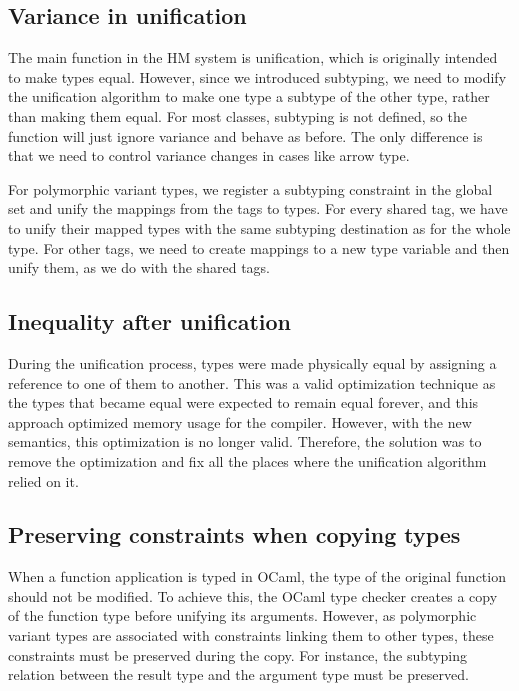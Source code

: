 \documentclass[a4paper,11pt,oneside]{article}
\theoremstyle{definition}
\begin{document}
\subsection{Variance in unification}

The main function in the HM system is unification, which is originally
intended to make types equal. However, since we introduced subtyping, we
need to modify the unification algorithm to make one type a subtype of the
other type, rather than making them equal. For most classes, subtyping is
not defined, so the function will just ignore variance and behave as before.
The only difference is that we need to control variance changes in cases
like arrow type.

For polymorphic variant types, we register a subtyping constraint in the
global set and unify the mappings from the tags to types. For every shared
tag, we have to unify their mapped types with the same subtyping destination
as for the whole type. For other tags, we need to create mappings to a new
type variable and then unify them, as we do with the shared tags.

\subsection{Inequality after unification}

During the unification process, types were made physically equal by
assigning a reference to one of them to another. This was a valid
optimization technique as the types that became equal were expected to
remain equal forever, and this approach optimized memory usage for the
compiler. However, with the new semantics, this optimization is no longer
valid. Therefore, the solution was to remove the optimization and fix all
the places where the unification algorithm relied on it.

\subsection{Preserving constraints when copying types}

When a function application is typed in OCaml, the type of the original
function should not be modified. To achieve this, the OCaml type checker
creates a copy of the function type before unifying its arguments. However,
as polymorphic variant types are associated with constraints linking them
to other types, these constraints must be preserved during the copy. For
instance, the subtyping relation between the result type and the argument
type must be preserved.
\end{document}
